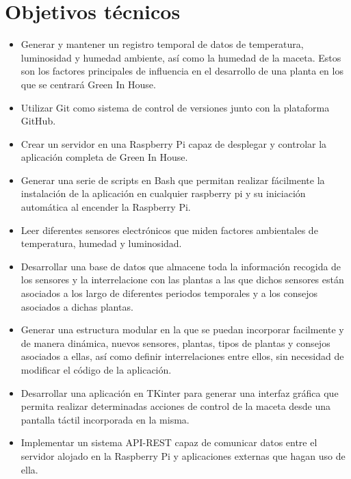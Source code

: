 \section{Objetivos técnicos}

\begin{itemize}

    \item Generar y mantener un registro temporal de datos de temperatura, luminosidad y humedad ambiente, así como la humedad de la maceta. Estos son los factores principales de influencia en el desarrollo de una planta en los que se centrará Green In House.
    
    \item Utilizar Git como sistema de control de versiones junto con
    la plataforma GitHub.
    
    \item Crear un servidor en una Raspberry Pi capaz de desplegar y controlar la aplicación completa de Green In House.
    
    \item Generar una serie de scripts en Bash que permitan realizar fácilmente la instalación de la aplicación en cualquier raspberry pi y su iniciación automática al encender la Raspberry Pi.
    
    \item Leer diferentes sensores electrónicos que miden factores ambientales de temperatura, humedad y luminosidad.
    
    \item Desarrollar una base de datos que almacene toda la información recogida de los sensores y la interrelacione con las plantas a las que dichos sensores están asociados a los largo de diferentes periodos temporales y a los consejos asociados a dichas plantas.
    
    \item Generar una estructura modular en la que se puedan incorporar facilmente y de manera dinámica, nuevos sensores, plantas, tipos de plantas y consejos asociados a ellas, así como definir interrelaciones entre ellos, sin necesidad de modificar el código de la aplicación.
    
    \item Desarrollar una aplicación en TKinter para generar una interfaz gráfica que permita realizar determinadas acciones de control de la maceta desde una pantalla táctil incorporada en la misma.
    
    \item Implementar un sistema API-REST capaz de comunicar datos entre el servidor alojado en la Raspberry Pi y aplicaciones externas que hagan uso de ella.
    

\end{itemize}
